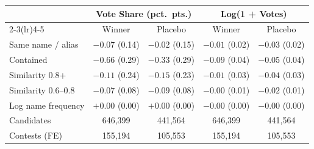 \begin{tabular}{lcccc}
\toprule
 & \multicolumn{2}{c}{Vote Share (pct.\ pts.)} & \multicolumn{2}{c}{Log(1 + Votes)} \\
\cmidrule(lr){2-3}\cmidrule(lr){4-5}
 & Winner & Placebo & Winner & Placebo \\
\midrule
Same name / alias & $-0.07$ (0.14) & $-0.02$ (0.15) & $-0.01$ (0.02) & $-0.03$ (0.02) \\
Contained & $-0.66$ (0.29) & $-0.33$ (0.29) & $-0.09$ (0.04) & $-0.05$ (0.04) \\
Similarity 0.8+ & $-0.11$ (0.24) & $-0.15$ (0.23) & $-0.01$ (0.03) & $-0.04$ (0.03) \\
Similarity 0.6--0.8 & $-0.07$ (0.08) & $-0.09$ (0.08) & $-0.00$ (0.01) & $-0.02$ (0.01) \\
Log name frequency & $+0.00$ (0.00) & $+0.00$ (0.00) & $-0.00$ (0.00) & $-0.00$ (0.00) \\
\midrule
Candidates & 646,399 & 441,564 & 646,399 & 441,564 \\
Contests (FE) & 155,194 & 105,553 & 155,194 & 105,553 \\
\bottomrule
\end{tabular}
